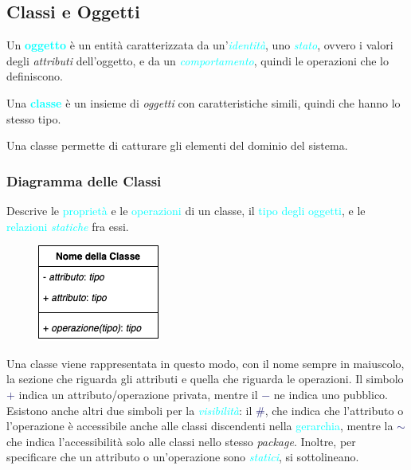 \subsection{Classi e Oggetti}

\begin{definition}[Oggetto]
    Un \textbf{\textcolor{cyan}{oggetto}} è un entità caratterizzata da un'\emph{\textcolor{cyan}{identità}},
    uno \emph{\textcolor{cyan}{stato}}, ovvero i valori degli \emph{attributi} dell'oggetto, e da un \emph{\textcolor{cyan}{comportamento}},
    quindi le operazioni che lo definiscono.
\end{definition}

\begin{definition}[Classe]
    Una \textbf{\textcolor{cyan}{classe}} è un insieme di \emph{oggetti} con caratteristiche simili,
    quindi che hanno lo stesso tipo.

    Una classe permette di catturare gli elementi del dominio del sistema.
\end{definition}

\subsubsection{Diagramma delle Classi}

Descrive le \textcolor{cyan}{proprietà} e le \textcolor{cyan}{operazioni} di un classe, il \textcolor{cyan}{tipo degli oggetti}, e le \textcolor{cyan}{relazioni \emph{statiche}} fra essi.

\begin{figure}
    \includegraphics[scale=0.7]{img/diagrammaclassi.png}
\end{figure}

Una classe viene rappresentata in questo modo, con il nome sempre in maiuscolo, la sezione che riguarda gli attributi
e quella che riguarda le operazioni. Il simbolo \textbf{\textcolor{MidnightBlue}{$+$}} indica un attributo/operazione privata, mentre il \textbf{\textcolor{MidnightBlue}{$-$}} ne indica uno
pubblico. Esistono anche altri due simboli per la \emph{\textcolor{cyan}{visibilità}}: il \textbf{\textcolor{MidnightBlue}{$\#$}}, che indica
che l'attributo o l'operazione è accessibile anche alle classi discendenti nella \textcolor{cyan}{gerarchia}, mentre la
\textbf{\textcolor{MidnightBlue}{$\sim$}} che indica l'accessibilità solo alle classi nello stesso \emph{package}.
Inoltre, per specificare che un attributo o un'operazione sono \emph{\textcolor{cyan}{statici}}, si sottolineano.

